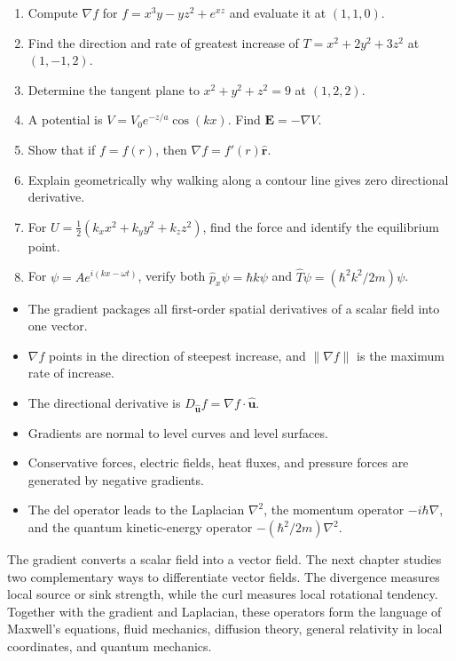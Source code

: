 
\begin{enumerate}
\item Compute $\nabla f$ for $f=x^3y-yz^2+e^{xz}$ and evaluate it at $(1,1,0)$.
\item Find the direction and rate of greatest increase of $T=x^2+2y^2+3z^2$ at $(1,-1,2)$.
\item Determine the tangent plane to $x^2+y^2+z^2=9$ at $(1,2,2)$.
\item A potential is $V=V_0e^{-z/a}\cos(kx)$. Find $\mathbf E=-\nabla V$.
\item Show that if $f=f(r)$, then $\nabla f=f'(r)\hat{\mathbf r}$.
\item Explain geometrically why walking along a contour line gives zero directional derivative.
\item For $U=\tfrac12(k_xx^2+k_yy^2+k_zz^2)$, find the force and identify the equilibrium point.
\item For $\psi=Ae^{i(kx-\omega t)}$, verify both $\hat p_x\psi=\hbar k\psi$ and $\hat T\psi=(\hbar^2k^2/2m)\psi$.
\end{enumerate}

\begin{booksummary}
\begin{itemize}
\item The gradient packages all first-order spatial derivatives of a scalar field into one vector.
\item $\nabla f$ points in the direction of steepest increase, and $\lVert\nabla f\rVert$ is the maximum rate of increase.
\item The directional derivative is $D_{\hat{\mathbf u}}f=\nabla f\cdot\hat{\mathbf u}$.
\item Gradients are normal to level curves and level surfaces.
\item Conservative forces, electric fields, heat fluxes, and pressure forces are generated by negative gradients.
\item The del operator leads to the Laplacian $\nabla^2$, the momentum operator $-i\hbar\nabla$, and the quantum kinetic-energy operator $-(\hbar^2/2m)\nabla^2$.
\end{itemize}
\end{booksummary}


The gradient converts a scalar field into a vector field. The next chapter studies two complementary ways to differentiate vector fields. The divergence measures local source or sink strength, while the curl measures local rotational tendency. Together with the gradient and Laplacian, these operators form the language of Maxwell's equations, fluid mechanics, diffusion theory, general relativity in local coordinates, and quantum mechanics.
